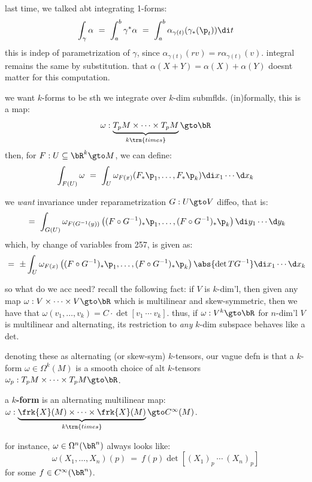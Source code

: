 last time, we talked abt integrating 1-forms:
\begin{equation*}
	\int_{\gamma}\alpha \ = \ \int_{a}^{b}\gamma^{*}\alpha
	\ = \ \int_{a}^{b}\alpha_{\gamma(t)}(\gamma_{*}(\p_{t}))\di t
\end{equation*}
this is indep of parametrization of $\gamma$, since $\alpha_{\gamma(t)}(rv)=r\alpha_{\gamma(t)}(v)$.
integral remains the same by substitution.
that $\alpha(X+Y)=\alpha(X)+\alpha(Y)$ doesnt matter for this computation.

\newpage %
we want $k$-forms to be sth we integrate over $k$-dim submflds.
(in)formally, this is a map:
\begin{equation*}
	\omega:\underbrace{T_{p}M\times \cdots \times T_{p}M}_{k \trm{ times}}\gto\bR
\end{equation*}
then, for $F:U\subseteq\bR^{k}\gto M$, we can define:
\begin{equation*}
	\int_{F(U)}\omega
	\ = \ \int_{U}\omega_{F(x)}(F_{*}\p_{1},\dots,F_{*}\p_{k})
	\di x_{1}\cdots\d x_{k}
\end{equation*}

we \textit{want} invariance under reparametrization $G:U\gto V$ diffeo, that is:
\begin{equation*}
	\ = \ \int_{G(U)}\omega_{F(G^{-1}(y))}
	\left((F\circ G^{-1})_{*}\p_{1},\dots,(F\circ G^{-1})_{*}\p_{k}\right)
	\di y_{1}\cdots\d y_{k}
\end{equation*}
which, by change of variables from 257, is given as:
\begin{equation*}
	\ = \ \pm\int_{U}\omega_{F(x)}
	\left((F\circ G^{-1})_{*}\p_{1},\dots,(F\circ G^{-1})_{*}\p_{k}\right)
	\abs{\det TG^{-1}}\di x_{1}\cdots\d x_{k}
\end{equation*}

so what do we acc need? recall the following fact: if $V$ is $k$-dim'l, then
given any map $\omega:V\times\cdots\times V\gto\bR$ which is multilinear and
skew-symmetric, then we have that
$\omega(v_{1},\dots,v_{k})=C\cdot\det[v_{1} \ \cdots \ v_{k}]$.
thus, if $\omega:V^{k}\gto\bR$ for $n$-dim'l $V$ is multilinear and alternating,
its restriction to \textit{any} $k$-dim subspace behaves like a det.

denoting these as alternating (or skew-sym) $k$-tensors,
our vague defn is that a $k$-form $\omega\in\Omega^{k}(M)$ is a smooth choice of
alt $k$-tensors $\omega_{p}:T_{p}M\times\cdots\times T_{p}M\gto\bR$.

\begin{defn}[title=Functional]
	a $k$\textbf{-form} is an alternating multilinear map:
	$\omega:\underbrace{\frk{X}(M)\times\cdots\times\frk{X}(M)}_{k \trm{ times}}\gto C^{\infty}(M)$.
\end{defn}
for instance, $\omega\in\Omega^{n}(\bR^{n})$ always looks like:
\begin{equation*}
	\omega(X_{1},\dots,X_{n})(p) \ = \ f(p)\det[(X_{1})_{p} \ \cdots \ (X_{n})_{p}]
\end{equation*}
for some $f\in C^{\infty}(\bR^{n})$.

